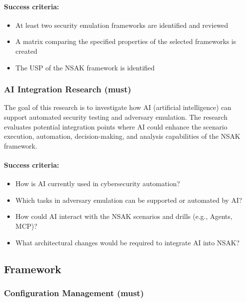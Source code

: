 \paragraph{Success criteria:}

\begin{itemize}
	\item At least two security emulation frameworks are identified and reviewed
	\item A matrix comparing the specified properties of the selected frameworks is created
	\item The USP of the \gls{NSAK} framework is identified
\end{itemize}

\subsubsection{\gls{AI} Integration Research (must)}\label{subsubsec:ai-integration-research}

The goal of this research is to investigate how \gls{AI} (artificial intelligence) can support automated security testing and adversary emulation.
The research evaluates potential integration points where \gls{AI} could enhance the scenario execution, automation, decision-making, and analysis capabilities of the \gls{NSAK} framework.

\paragraph{Success criteria:}

\begin{itemize}
	\item How is \gls{AI} currently used in cybersecurity automation?
	\item Which tasks in adversary emulation can be supported or automated by \gls{AI}?
	\item How could \gls{AI} interact with the \gls{NSAK} scenarios and drills (e.g., Agents, \gls{MCP})?
	\item What architectural changes would be required to integrate \gls{AI} into \gls{NSAK}?
\end{itemize}

\subsection{Framework}\label{subsec:framework}

\subsubsection{Configuration Management (must)}\label{subsubsec:configuration-management}

